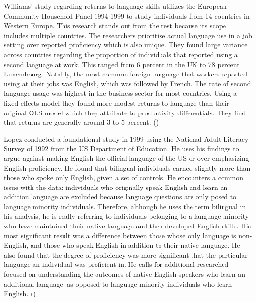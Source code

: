 \documentclass[12pt,english]{article}
\begin{document}
Williams' study regarding returns to language skills utilizes the European Community Household Panel 1994-1999 to study individuals from 14 countries in Western Europe. This research stands out from the rest because its scope includes multiple countries. The researchers prioritize actual language use in a job setting over reported proficiency which is also unique. They found large variance across countries regarding the proportion of individuals that reported using a second language at work. This ranged from 6 percent in the UK to 78 percent Luxembourg. Notably, the most common foreign language that workers reported using at their jobs was English, which was followed by French. The rate of second language usage was highest in the business sector for most countries. Using a fixed effects model they found more modest returns to language than their original OLS model which they attribute to productivity differentials. They find that returns are generally around 3 to 5 percent.  (\citet{Western})

Lopez conducted a foundational study in 1999 using the National Adult Literacy Survey of 1992 from the US Department of Education. 
He uses his findings to argue against making English the official language of the US or over-emphasizing English proficiency. He found that bilingual individuals earned slightly more than those who spoke only English, given a set of controls. He encounters a common issue with the data: individuals who originally speak English and learn an addition language are excluded because language questions are only posed to language minority individuals. Therefore, although he uses the term bilingual in his analysis, he is really referring to individuals belonging to a language minority who have maintained their native language and then developed English skills. His most significant result was a difference between those whose only language is non-English, and those who speak English in addition to their native language. He also found that the degree of proficiency was more significant that the particular language an individual was proficient in. He calls for additional researched focused on understanding the outcomes of native English speakers who learn an additional language, as opposed to language minority individuals who learn English. (\citet{Lopez})
\end{document}
